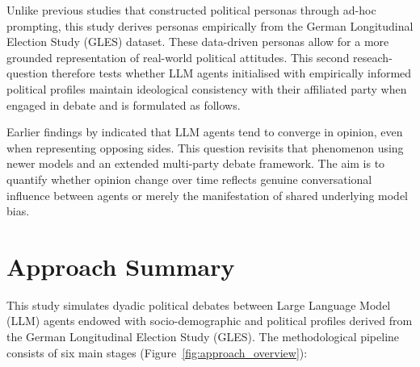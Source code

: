 Unlike previous studies that constructed political personas through ad-hoc prompting, this study derives personas empirically from the German Longitudinal Election Study (GLES) dataset. These data-driven personas allow for a more grounded representation of real-world political attitudes. This second reseach-question therefore tests whether LLM agents initialised with empirically informed political profiles maintain ideological consistency with their affiliated party when engaged in debate and is formulated as follows.


Earlier findings by \citet{taubenfeld_systematic_2024} indicated that LLM agents tend to converge in opinion, even when representing opposing sides. This question revisits that phenomenon using newer models and an extended multi-party debate framework. The aim is to quantify whether opinion change over time reflects genuine conversational influence between agents or merely the manifestation of shared underlying model bias.




\section{Approach Summary}

This study simulates dyadic political debates between Large Language Model (LLM) agents endowed with socio-demographic and political profiles derived from the German Longitudinal Election Study (GLES). The methodological pipeline consists of six main stages (Figure~\ref{fig:approach_overview}):

